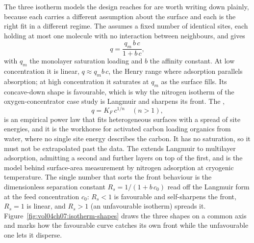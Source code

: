 The three isotherm models the design reaches for are worth writing down
plainly, because each carries a different assumption about the surface and
each is the right fit in a different regime. The 
assumes a fixed number of identical sites, each holding at most one molecule
with no interaction between neighbours, and gives
\[
q = \frac{q_m\,b\,c}{1 + b\,c},
\]
with $q_m$ the monolayer saturation loading and $b$ the affinity constant. At
low concentration it is linear, $q \approx q_m b\,c$, the Henry range where
adsorption parallels absorption; at high concentration it saturates at $q_m$
as the surface fills. Its concave-down shape is favourable, which is why the
nitrogen isotherm of the oxygen-concentrator case study is Langmuir and
sharpens its front. The ,
\[
q = K_F\,c^{1/n} \quad (n > 1),
\]
is an empirical power law that fits heterogeneous surfaces with a spread of
site energies, and it is the workhorse for activated carbon loading organics
from water, where no single site energy describes the carbon. It has no
saturation, so it must not be extrapolated past the data. The  extends Langmuir to multilayer adsorption, admitting a second and
further layers on top of the first, and is the model behind surface-area
measurement by nitrogen adsorption at cryogenic temperature. The single
number that sorts the front behaviour is the dimensionless separation
constant $R_s = 1/(1 + b\,c_0)$ read off the Langmuir form at the feed
concentration $c_0$: $R_s < 1$ is favourable and self-sharpens the front,
$R_s = 1$ is linear, and $R_s > 1$ (an unfavourable isotherm) spreads it.
Figure~\ref{fig:vol04ch07:isotherm-shapes} draws the three shapes on a common
axis and marks how the favourable curve catches its own front while the
unfavourable one lets it disperse.



